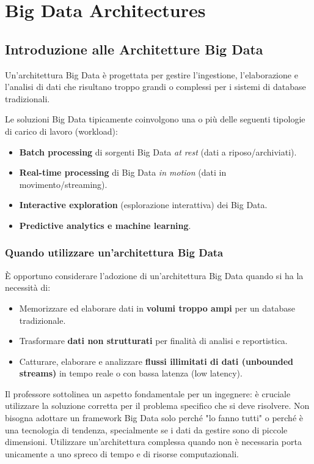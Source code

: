 \chapter{Big Data Architectures}

\section{Introduzione alle Architetture Big Data}

Un'architettura Big Data è progettata per gestire l'ingestione, l'elaborazione e l'analisi di dati che risultano troppo grandi o complessi per i sistemi di database tradizionali. 

Le soluzioni Big Data tipicamente coinvolgono una o più delle seguenti tipologie di carico di lavoro (workload):
\begin{itemize}
    \item \textbf{Batch processing} di sorgenti Big Data \textit{at rest} (dati a riposo/archiviati).
    \item \textbf{Real-time processing} di Big Data \textit{in motion} (dati in movimento/streaming).
    \item \textbf{Interactive exploration} (esplorazione interattiva) dei Big Data.
    \item \textbf{Predictive analytics e machine learning}.
\end{itemize}

\subsection{Quando utilizzare un'architettura Big Data}
È opportuno considerare l'adozione di un'architettura Big Data quando si ha la necessità di:
\begin{itemize}
    \item Memorizzare ed elaborare dati in \textbf{volumi troppo ampi} per un database tradizionale.
    \item Trasformare \textbf{dati non strutturati} per finalità di analisi e reportistica.
    \item Catturare, elaborare e analizzare \textbf{flussi illimitati di dati (unbounded streams)} in tempo reale o con bassa latenza (low latency).
\end{itemize}

\begin{remark}
Il professore sottolinea un aspetto fondamentale per un ingegnere: è cruciale utilizzare la soluzione corretta per il problema specifico che si deve risolvere. Non bisogna adottare un framework Big Data solo perché "lo fanno tutti" o perché è una tecnologia di tendenza, specialmente se i dati da gestire sono di piccole dimensioni. Utilizzare un'architettura complessa quando non è necessaria porta unicamente a uno spreco di tempo e di risorse computazionali.
\end{remark}

